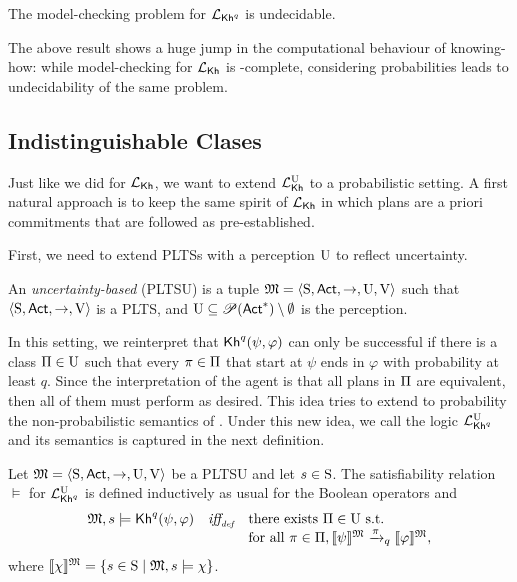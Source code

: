 \begin{theorem}\label{th:mc:PKh:undecidable}
  The model-checking problem for $\PKh$ is undecidable.
\end{theorem}

The above result shows a huge jump in the computational behaviour of
knowing-how: while model-checking for $\Khlogic$ is \PSPACE-complete,
considering probabilities leads to undecidability of the same problem.


\subsection{Indistinguishable Clases}\label{subsec:prob:indist:committed}

Just like we did for $\Khlogic$, we want to extend $\Khunc$ to a
probabilistic setting.  A first natural approach is to keep the same
spirit of $\Khlogic$ in which plans are a priori commitments that are
followed as pre-established.

First, we need to extend PLTSs with a perception $\Unc$ to
reflect uncertainty.

\begin{definition}\label{def:pltsu}
    An \emph{uncertainty-based \lts} (PLTSU) is a tuple
    $\model=\tup{\S,\Act,\ra,\Unc,\V}$ such that
    $\tup{\S,\Act,\ra,\V}$ is a PLTS, and $\Unc\subseteq
    \powerset(\Act^*)\setminus \emptyset$ is the perception.
\end{definition}

In this setting, we reinterpret that $\kh^q(\psi,\varphi)$ can only be
successful if there is a class $\plans\in\Unc$ such that every
$\plan\in\plans$ that start at $\psi$ ends in $\varphi$ with
probability at least $q$.  Since the interpretation of the agent is
that all plans in $\plans$ are equivalent, then all of them must 
perform as desired.  This idea tries to extend to probability the
non-probabilistic semantics of .
Under this new idea, we call the logic $\PKhunc$ and its semantics is
captured in the next definition.


\begin{definition}\label{def:semantics:PKhunc}
  Let $\model = \tup{\S,\Act,\ra,\Unc,\V}$ be a PLTSU and let $s\in\S$.  The
  satisfiability relation $\models$ for $\PKhunc$ is defined inductively 
  as usual for the Boolean operators and
  \[
  \begin{array}{l@{\ \ \ }c@{\ \ \  }l}
    \model, s \models \kh^q(\psi,\varphi) & \iffdef &  \text{there exists } {\plans \in \Unc} \text{ s.t.} \\
    & & \text{for all } {\plan\in\plans}, {\truthset{\model}{\psi} \reach{\plan}_q \truthset{\model}{\varphi}}, 
  \end{array}
  \]    
  where $\truthset{\model}{\chi} = \csetsc{s\in\S}{\model,s\models\chi}$.
\end{definition}

